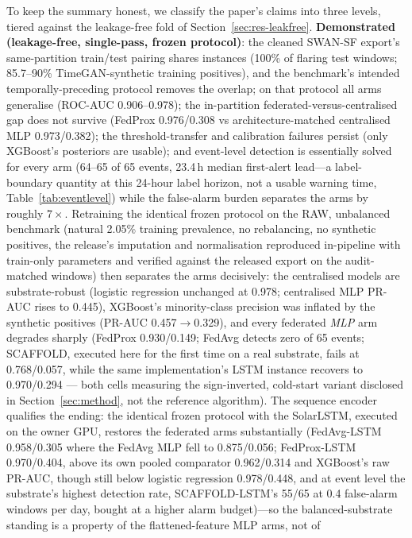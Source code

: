 To keep the summary honest, we classify the paper's claims into three
levels, tiered against the leakage-free fold of
Section~\ref{sec:res-leakfree}. \textbf{Demonstrated (leakage-free,
single-pass, frozen protocol)}: the cleaned SWAN-SF export's
same-partition train/test pairing shares instances (100\% of flaring
test windows; 85.7--90\% TimeGAN-synthetic training positives), and
the benchmark's intended temporally-preceding protocol removes the
overlap; on that protocol all arms generalise (ROC-AUC 0.906--0.978);
the in-partition federated-versus-centralised gap does not survive
(FedProx 0.976/0.308 vs architecture-matched centralised MLP
0.973/0.382); the threshold-transfer and
calibration failures persist (only XGBoost's posteriors are usable);
and event-level detection is essentially solved for every arm (64--65
of 65 events, 23.4\,h median first-alert lead---a label-boundary
quantity at this 24-hour label horizon, not a usable warning time,
Table~\ref{tab:eventlevel}) while the false-alarm burden
separates the arms by roughly $7\times$. Retraining the identical
frozen protocol on the RAW, unbalanced benchmark (natural 2.05\%
training prevalence, no rebalancing, no synthetic positives, the
release's imputation and normalisation reproduced in-pipeline with
train-only parameters and verified against the released export on
the audit-matched windows) then separates the arms decisively: the
centralised models are substrate-robust (logistic regression
unchanged at 0.978; centralised MLP PR-AUC rises to 0.445),
XGBoost's minority-class precision was inflated by the synthetic
positives (PR-AUC 0.457$\to$0.329), and every federated \emph{MLP}
arm degrades sharply (FedProx 0.930/0.149; FedAvg detects zero of 65
events; SCAFFOLD, executed here for the first time on a real
substrate, fails at 0.768/0.057, while the same implementation's
LSTM instance recovers to 0.970/0.294 --- both cells measuring the
sign-inverted, cold-start variant disclosed in
Section~\ref{sec:method}, not the reference algorithm). The sequence
encoder qualifies the
ending: the identical frozen protocol with the SolarLSTM, executed
on the owner GPU, restores the federated arms substantially
(FedAvg-LSTM 0.958/0.305 where the FedAvg MLP fell to 0.875/0.056;
FedProx-LSTM 0.970/0.404, above its own pooled comparator
0.962/0.314 and XGBoost's raw PR-AUC, though still below logistic
regression 0.978/0.448, and at event level the substrate's highest
detection rate, SCAFFOLD-LSTM's 55/65 at 0.4 false-alarm windows per
day, bought at a higher alarm budget)---so the balanced-substrate
standing is a property of the flattened-feature MLP arms, not of
